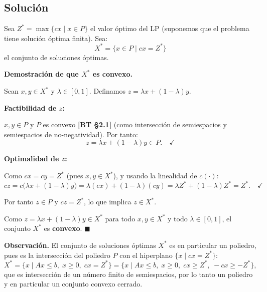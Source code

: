 \documentclass{article}
\begin{document}
\subsection*{Solución}

Sea $Z^* = \max\{cx \mid x \in P\}$ el valor óptimo del LP (suponemos que el problema tiene solución óptima finita). Sea:
\[
  X^* = \{x \in P \mid cx = Z^*\}
\]
el conjunto de soluciones óptimas.

\textbf{Demostración de que $X^*$ es convexo.}

Sean $x, y \in X^*$ y $\lambda \in [0,1]$. Definamos $z = \lambda x + (1-\lambda)y$.

\textbf{Factibilidad de $z$:}

$x, y \in P$ y $P$ es convexo \textbf{[BT §2.1]} (como intersección de semiespacios y semiespacios de no-negatividad). Por tanto:
\[
  z = \lambda x + (1-\lambda) y \in P. \quad \checkmark
\]

\textbf{Optimalidad de $z$:}

Como $cx = cy = Z^*$ (pues $x, y \in X^*$), y usando la linealidad de $c(\cdot)$:
\[
  cz = c\bigl(\lambda x + (1-\lambda)y\bigr) = \lambda(cx) + (1-\lambda)(cy) = \lambda Z^* + (1-\lambda) Z^* = Z^*. \quad \checkmark
\]

Por tanto $z \in P$ y $cz = Z^*$, lo que implica $z \in X^*$.

Como $z = \lambda x + (1-\lambda)y \in X^*$ para todo $x, y \in X^*$ y todo $\lambda \in [0,1]$, el conjunto $X^*$ es \textbf{convexo}. $\blacksquare$

\medskip
\textbf{Observación.} El conjunto de soluciones óptimas $X^*$ es en particular un poliedro, pues es la intersección del poliedro $P$ con el hiperplano $\{x \mid cx = Z^*\}$:
\[
  X^* = \{x \mid Ax \leq b,\; x \geq 0,\; cx = Z^*\} = \{x \mid Ax \leq b,\; x \geq 0,\; cx \geq Z^*,\; -cx \geq -Z^*\},
\]
que es intersección de un número finito de semiespacios, por lo tanto un poliedro y en particular un conjunto convexo cerrado.
\end{document}
